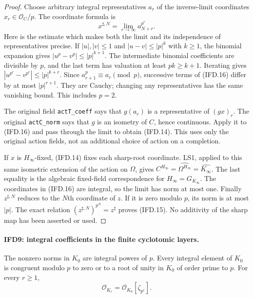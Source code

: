 \documentclass[11pt,a4paper]{article}
\numberwithin{equation}{section}
\theoremstyle{remark}\newtheorem{remark}[theorem]{Remark}
\begin{document}
\begin{proof}
Choose arbitrary integral representatives $a_r$ of the inverse-limit
coordinates $x_r\in\mathcal O_C/p$. The coordinate formula is
\[
                 x^{\sharp,N}=\lim_{r\to\infty}a_{N+r}^{p^r}.
                                                               \tag{IFD.16}
\]
Here is the estimate which makes both the limit and its independence
of representatives precise. If $|u|,|v|\leq1$ and $|u-v|\leq|p|^k$
with $k\geq1$, the binomial expansion gives
$|u^p-v^p|\leq|p|^{k+1}$. The intermediate binomial coefficients
are divisible by $p$, and the last term has valuation at least
$pk\geq k+1$. Iterating gives
$|u^{p^r}-v^{p^r}|\leq|p|^{k+r}$.
Since $a_{r+1}^p\equiv a_r\pmod p$, successive terms of (IFD.16)
differ by at most $|p|^{r+1}$. They are Cauchy; changing any
representatives has the same vanishing bound. This includes $p=2$.

The original field \texttt{act\allowbreak T\_\allowbreak coeff} says that $g(a_r)$ is a
representative of $(gx)_r$. The original \texttt{act\allowbreak C\_\allowbreak norm} says
that $g$ is an isometry of $C$, hence continuous. Apply it to
(IFD.16) and pass through the limit to obtain (IFD.14).
This uses only the original action fields, not an additional choice
of action on a completion.

If $x$ is $H_\infty$-fixed, (IFD.14) fixes each sharp-root
coordinate. LS1, applied to this same isometric extension of the
action on $\Omega$, gives
$C^{H_\infty}=\widehat{\Omega^{H_\infty}}
=\widehat{K_\infty}$. The last equality is the algebraic
fixed-field correspondence for $H_\infty=G_{K_\infty}$.
The coordinates in (IFD.16) are integral, so the limit has norm at
most one. Finally $z^{\sharp,N}$ reduces to the $N$th coordinate
of $z$. If it is zero modulo $p$, its norm is at most $|p|$.
The exact relation $(z^{\sharp,N})^{p^N}=z^\sharp$ proves (IFD.15).
No additivity of the sharp map has been asserted or used.
\end{proof}

\paragraph{IFD9: integral coefficients in the finite cyclotomic layers.}
\label{claim:IFD9}
The nonzero norms in $K_0$ are integral powers of $p$.
Every integral element of $K_0$ is congruent modulo $p$ to zero or
to a root of unity in $K_0$ of order prime to $p$.
For every $r\geq1$,
\[
                 \mathcal O_{K_r}=\mathcal O_{K_0}[\zeta_{p^r}].
                                                               \tag{IFD.17}
\]
\end{document}
